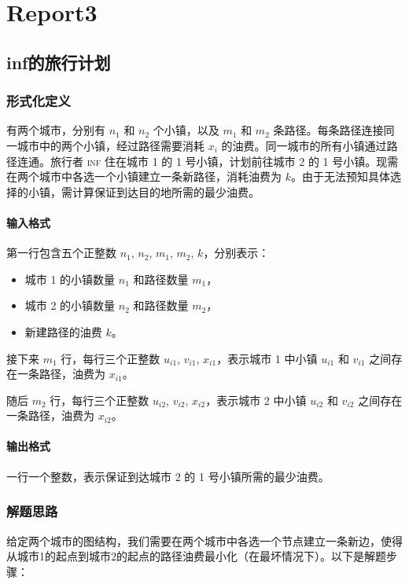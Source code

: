 \documentclass[../mainReport.tex]{subfiles}
\begin{document}
\section{Report3}
\subsection{inf的旅行计划}
\subsubsection{形式化定义}
有两个城市，分别有 $n_1$ 和 $n_2$ 个小镇，以及 $m_1$ 和 $m_2$ 条路径。每条路径连接同一城市中的两个小镇，经过路径需要消耗 $x_i$ 的油费。同一城市的所有小镇通过路径连通。旅行者 \textsc{inf} 住在城市 1 的 1 号小镇，计划前往城市 2 的 1 号小镇。现需在两个城市中各选一个小镇建立一条新路径，消耗油费为 $k$。由于无法预知具体选择的小镇，需计算保证到达目的地所需的最少油费。

\paragraph{输入格式}
第一行包含五个正整数 $n_1$, $n_2$, $m_1$, $m_2$, $k$，分别表示：
\begin{itemize}
    \item 城市 1 的小镇数量 $n_1$ 和路径数量 $m_1$，
    \item 城市 2 的小镇数量 $n_2$ 和路径数量 $m_2$，
    \item 新建路径的油费 $k$。
\end{itemize}

接下来 $m_1$ 行，每行三个正整数 $u_{i1}$, $v_{i1}$, $x_{i1}$，表示城市 1 中小镇 $u_{i1}$ 和 $v_{i1}$ 之间存在一条路径，油费为 $x_{i1}$。

随后 $m_2$ 行，每行三个正整数 $u_{i2}$, $v_{i2}$, $x_{i2}$，表示城市 2 中小镇 $u_{i2}$ 和 $v_{i2}$ 之间存在一条路径，油费为 $x_{i2}$。

\paragraph{输出格式}
一行一个整数，表示保证到达城市 2 的 1 号小镇所需的最少油费。

\subsubsection{解题思路}
给定两个城市的图结构，我们需要在两个城市中各选一个节点建立一条新边，使得从城市1的起点到城市2的起点的路径油费最小化（在最坏情况下）。以下是解题步骤：
\end{document}
